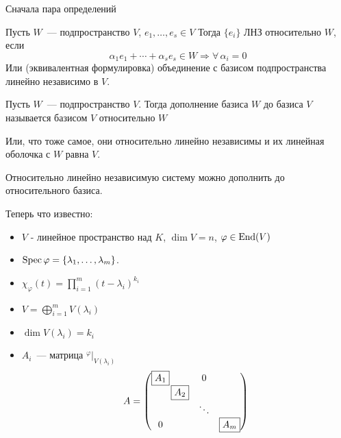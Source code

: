 \documentclass[12pt]{../../../notes}
\begin{document}

Сначала пара определений
\begin{defn}\label{defn:linop::jnf::relind}
  Пусть $W$~--- подпространство $V$, $e_1, \dotsc, e_s \in V$ Тогда $\{e_i\}$ ЛНЗ относительно $W$, если
  \[
    \alpha_1 e_1 + \dotsb + \alpha_s e_s \in W \Rightarrow \forall\, \alpha_i = 0
  \]
  Или (эквивалентная формулировка) объединение с базисом подпространства линейно независимо в $V$.
\end{defn}

\begin{defn}\label{defn:linop::jnf::relbasis}
  Пусть $W$~--- подпространство $V$. Тогда дополнение базиса $W$ до базиса $V$ называется базисом $V$ относительно
  $W$

  Или, что тоже самое, они относительно линейно независимы и их линейная оболочка с $W$ равна $V$.
\end{defn}


\begin{lem}\label{lem:linop::jnf::relindtorelbasis}
  Относительно линейно независимую систему можно дополнить до относительного базиса.
\end{lem}

Теперь что известно:
\begin{itemize}
  \item $V$ - линейное пространство над $K$, $\dim V = n$, $\varphi\in \operatorname{End}(V)$
  \item $\operatorname{Spec} \varphi = \{\lambda_1, \dotsc, \lambda_m\}$.
  \item $\displaystyle \chi_\varphi(t) = \prod_{i=1}^m(t-\lambda_i)^{k_i}$
  \item $V = \bigoplus\limits_{i=1}^m V (\lambda_i)$
  \item $\dim V(\lambda_i) = k_i$
  \item $A_i$~--- матрица ${}^\varphi\big|_{V(\lambda_i)}$
    \[
    A = \begin{pmatrix}
          \boxed{A_1} &    ~        &   0    &  \\
              ~       &\mkern -15mu \boxed{A_2} &   ~    &  \\
              ~       &    ~        & \ddots &  \\
              0       &    ~        &   ~    & \boxed{A_m}
        \end{pmatrix}
  \]
\end{itemize}
\end{document}
